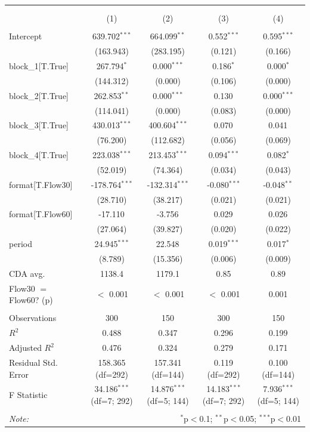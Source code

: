 \begin{table}[!htbp] \centering
\begin{tabular}{@{\extracolsep{5pt}}lcccc}
\\[-1.8ex]\hline
\hline \\[-1.8ex]
\\[-1.8ex] & (1) & (2) & (3) & (4) \\
\hline \\[-1.8ex]
 Intercept & 639.702$^{***}$ & 664.099$^{**}$ & 0.552$^{***}$ & 0.595$^{***}$ \\
& (163.943) & (283.195) & (0.121) & (0.166) \\
 block_1[T.True] & 267.794$^{*}$ & 0.000$^{***}$ & 0.186$^{*}$ & 0.000$^{*}$ \\
& (144.312) & (0.000) & (0.106) & (0.000) \\
 block_2[T.True] & 262.853$^{**}$ & 0.000$^{***}$ & 0.130$^{}$ & 0.000$^{***}$ \\
& (114.041) & (0.000) & (0.083) & (0.000) \\
 block_3[T.True] & 430.013$^{***}$ & 400.604$^{***}$ & 0.070$^{}$ & 0.041$^{}$ \\
& (76.200) & (112.682) & (0.056) & (0.069) \\
 block_4[T.True] & 223.038$^{***}$ & 213.453$^{***}$ & 0.094$^{***}$ & 0.082$^{*}$ \\
& (52.019) & (74.364) & (0.034) & (0.043) \\
 format[T.Flow30] & -178.764$^{***}$ & -132.314$^{***}$ & -0.080$^{***}$ & -0.048$^{**}$ \\
& (28.710) & (38.217) & (0.021) & (0.021) \\
 format[T.Flow60] & -17.110$^{}$ & -3.756$^{}$ & 0.029$^{}$ & 0.026$^{}$ \\
& (27.064) & (39.827) & (0.020) & (0.022) \\
 period & 24.945$^{***}$ & 22.548$^{}$ & 0.019$^{***}$ & 0.017$^{*}$ \\
& (8.789) & (15.356) & (0.006) & (0.009) \\
 CDA avg. & 1138.4 & 1179.1 & 0.85 & 0.89 \\
 Flow30 $=$ Flow60? (p) & $<$ 0.001 & $<$ 0.001 & $<$ 0.001 & 0.001 \\
\hline \\[-1.8ex]
 Observations & 300 & 150 & 300 & 150 \\
 $R^2$ & 0.488 & 0.347 & 0.296 & 0.199 \\
 Adjusted $R^2$ & 0.476 & 0.324 & 0.279 & 0.171 \\
 Residual Std. Error & 158.365 (df=292) & 157.341 (df=144) & 0.119 (df=292) & 0.100 (df=144) \\
 F Statistic & 34.186$^{***}$ (df=7; 292) & 14.876$^{***}$ (df=5; 144) & 14.183$^{***}$ (df=7; 292) & 7.936$^{***}$ (df=5; 144) \\
\hline
\hline \\[-1.8ex]
\textit{Note:} & \multicolumn{4}{r}{$^{*}$p$<$0.1; $^{**}$p$<$0.05; $^{***}$p$<$0.01} \\
\end{tabular}
\end{table}